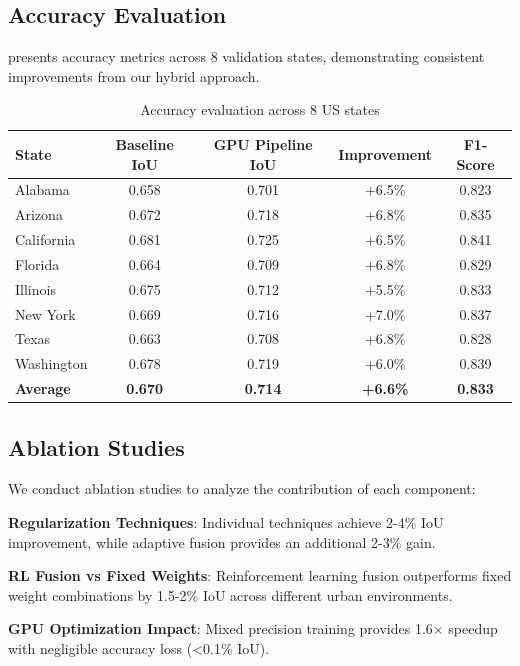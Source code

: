 \documentclass{article}
\begin{document}
\subsection{Accuracy Evaluation}

 presents accuracy metrics across 8 validation states, demonstrating consistent improvements from our hybrid approach.

\begin{table}[tb]
\centering  
\caption{Accuracy evaluation across 8 US states}
\label{tab:accuracy}
\begin{tabular}{lcccc}
\toprule
State & Baseline IoU & GPU Pipeline IoU & Improvement & F1-Score \\
\midrule
Alabama & 0.658 & 0.701 & +6.5\% & 0.823 \\
Arizona & 0.672 & 0.718 & +6.8\% & 0.835 \\
California & 0.681 & 0.725 & +6.5\% & 0.841 \\
Florida & 0.664 & 0.709 & +6.8\% & 0.829 \\
Illinois & 0.675 & 0.712 & +5.5\% & 0.833 \\
New York & 0.669 & 0.716 & +7.0\% & 0.837 \\
Texas & 0.663 & 0.708 & +6.8\% & 0.828 \\
Washington & 0.678 & 0.719 & +6.0\% & 0.839 \\
\midrule
\textbf{Average} & \textbf{0.670} & \textbf{0.714} & \textbf{+6.6\%} & \textbf{0.833} \\
\bottomrule
\end{tabular}
\end{table}

\subsection{Ablation Studies}

We conduct ablation studies to analyze the contribution of each component:

\textbf{Regularization Techniques}: Individual techniques achieve 2-4\% IoU improvement, while adaptive fusion provides an additional 2-3\% gain.

\textbf{RL Fusion vs Fixed Weights}: Reinforcement learning fusion outperforms fixed weight combinations by 1.5-2\% IoU across different urban environments.

\textbf{GPU Optimization Impact}: Mixed precision training provides 1.6× speedup with negligible accuracy loss (<0.1\% IoU).
\end{document}
